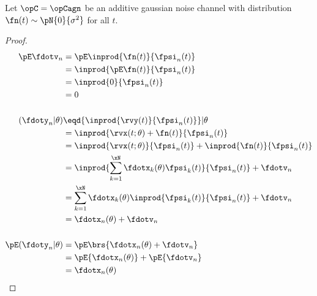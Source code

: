 \begin{proposition}
\begin{theorem}%
\label{thm:agn_stats}
Let $\opC=\opCagn$ be an additive gaussian noise channel
with distribution $\fn(t)\sim\pN{0}{\sigma^2}$ for all $t$.
\end{theorem}
\begin{proof}
\begin{align*}
   \pE\fdotv_{n}
     &= \pE\inprod{\fn(t)}{\fpsi_n(t)}
   \\&= \inprod{\pE\fn(t)}{\fpsi_n(t)}
   \\&= \inprod{0}{\fpsi_n(t)}
   \\&= 0
\\
\\
   (\fdoty_n |\theta)
     &\eqd {\inprod{\rvy(t)}{\fpsi_n(t)}}  |\theta
   \\&=    {\inprod{\rvx(t;\theta)+\fn(t)}{\fpsi_n(t)}}
   \\&=    {\inprod{\rvx(t;\theta)}{\fpsi_n(t)}} +   {\inprod{\fn(t)}{\fpsi_n(t)}}
   \\&=    \inprod{\sum_{k=1}^\xN \fdotx_k(\theta) \fpsi_k(t)}{\fpsi_n(t)} + \fdotv_n
   \\&=    \sum_{k=1}^\xN \fdotx_k(\theta) \inprod{\fpsi_k(t)}{\fpsi_n(t)} + \fdotv_n
   \\&=    \fdotx_n(\theta)  + \fdotv_n
\\ \\
   \pE({\fdoty_n} | \theta)
     &= \pE\brs{\fdotx_n(\theta)  + \fdotv_n}
   \\&= \pE{\fdotx_n(\theta) } +   \pE{\fdotv_n}
   \\&= \fdotx_n(\theta)
\end{align*}


\end{proof}
\end{proposition}
